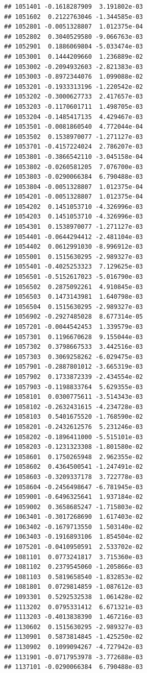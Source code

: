 \documentclass[ignorenonframetext,]{beamer}
\begin{document}
\begin{frame}[fragile]
\begin{verbatim}
## 1051401 -0.1618287909  3.191802e-03
## 1051602  0.2122763046 -1.344585e-03
## 1052801 -0.0051328807  1.012375e-04
## 1052802  0.3040529580 -9.066763e-03
## 1052901  0.1886069804 -5.033474e-03
## 1053001  0.1444209660  1.236889e-02
## 1053002 -0.2094932603 -2.821383e-03
## 1053003 -0.8972344076  1.099088e-02
## 1053201 -0.1933313196 -1.220542e-02
## 1053202 -0.3000627733  2.417657e-03
## 1053203 -0.1170601711  1.498705e-03
## 1053204 -0.1485417135  4.429467e-03
## 1053501 -0.0081860540  4.772044e-04
## 1053502  0.1538970077 -1.271127e-03
## 1053701 -0.4157224024  2.786207e-03
## 1053801 -0.3866542110 -3.045158e-04
## 1053802 -0.0260581205  7.076700e-03
## 1053803 -0.0290066384  6.790488e-03
## 1053804 -0.0051328807  1.012375e-04
## 1054201 -0.0051328807  1.012375e-04
## 1054202  0.1451053710 -4.326996e-03
## 1054203  0.1451053710 -4.326996e-03
## 1054301  0.1538970077 -1.271127e-03
## 1054401 -0.0644294412 -2.481104e-03
## 1054402  0.0612991030 -8.996912e-03
## 1055001  0.1515630295 -2.989327e-03
## 1055401 -0.4025253323  7.129625e-03
## 1056501 -0.5152617023 -5.016790e-03
## 1056502  0.2875092261  4.910845e-03
## 1056503  0.1473143981  1.640798e-03
## 1056504  0.1515630295 -2.989327e-03
## 1056902 -0.2927485028  8.677314e-05
## 1057201 -0.0044542453  1.339579e-03
## 1057301  0.1196670628  9.155044e-03
## 1057302  0.3798667533  3.442516e-03
## 1057303  0.3069258262 -6.029475e-03
## 1057901 -0.2887801012 -3.665319e-03
## 1057902  0.1733872339 -2.434554e-02
## 1057903 -0.1198833764  5.629355e-03
## 1058101  0.0300775611 -3.514343e-03
## 1058102 -0.2632431615 -4.234728e-03
## 1058103  0.5401675520 -1.768590e-02
## 1058201 -0.2432612576  5.231246e-03
## 1058202 -0.1896411000 -5.515101e-03
## 1058203 -0.1231323308 -1.801580e-02
## 1058601  0.1750265948  2.962355e-02
## 1058602  0.4364500541 -1.247491e-02
## 1058603 -0.3209337178  3.722778e-03
## 1058604 -0.2456498647 -6.781945e-03
## 1059001 -0.6496325641  1.937184e-02
## 1059002  0.3658685247 -1.715803e-02
## 1063401 -0.3017268690  1.617403e-02
## 1063402 -0.1679713550  1.503140e-02
## 1063403 -0.1916893106  1.854504e-02
## 1075201 -0.0410950591  2.533702e-02
## 1081101  0.0773241817  3.715360e-03
## 1081102  0.2379545060 -1.205866e-03
## 1081103  0.5819658540 -1.832853e-02
## 1081801  0.0729814859 -1.087612e-03
## 1093301  0.5292532538  1.061428e-02
## 1113202  0.0795331412  6.671321e-03
## 1113203 -0.4013838390  1.467216e-03
## 1130602  0.1515630295 -2.989327e-03
## 1130901  0.5873814845 -1.425250e-02
## 1130902  0.1099094267 -4.727942e-03
## 1131901 -0.0717953978 -3.772688e-03
## 1137101 -0.0290066384  6.790488e-03

\end{verbatim}
\end{frame}
\end{document}
